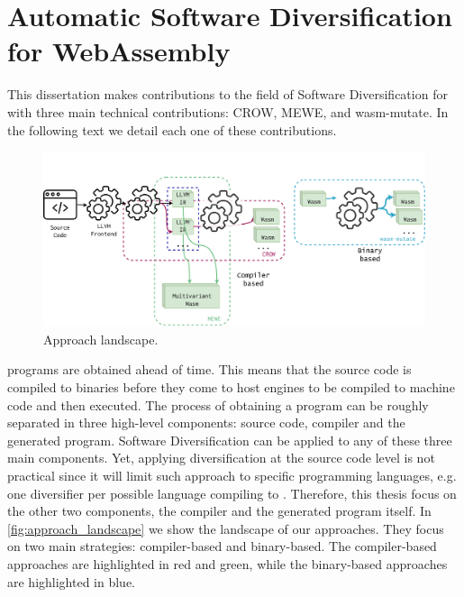 \chapter{Automatic Software Diversification for WebAssembly}
\label{tech}

This dissertation makes contributions to the field of Software Diversification for \Wasm with three main technical contributions: CROW, MEWE, and wasm-mutate.
In the following text we detail each one of these contributions.



\begin{figure}[h]
	\centering
	\includegraphics[width=1.0\textwidth]{figures/landscape.pdf}
	\caption{Approach landscape.}
	\label{fig:approach_landscape}
\end{figure}

\Wasm programs are obtained ahead of time.
This means that the source code is compiled to \wasm binaries before they come to host engines to be compiled to machine code and then executed.
The process of obtaining a \Wasm program can be roughly separated in three high-level components: source code, compiler and the generated \Wasm program.
Software Diversification can be applied to any of these three main components.
Yet, applying diversification at the source code level is not practical since it will limit such approach to specific programming languages, e.g. one diversifier per possible language compiling to \Wasm.
Therefore, this thesis focus on the other two components, the compiler and the generated \Wasm program itself.
In \autoref{fig:approach_landscape} we show the landscape of our approaches.
They focus on two main strategies: compiler-based and binary-based.
The compiler-based approaches are highlighted in red and green, while the binary-based approaches are highlighted in blue.

